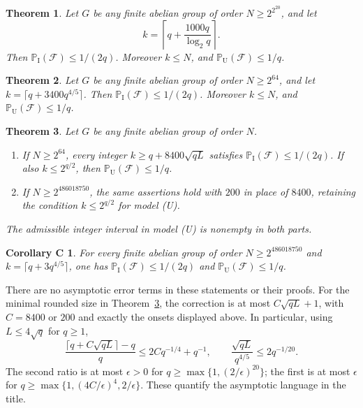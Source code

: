 \documentclass[11pt]{amsart}
\newtheorem{theorem}{Theorem}
\newtheorem*{corC}{Corollary C}
\theoremstyle{remark}
\newcommand{\PI}{\mathbb P_{\mathrm I}}
\newcommand{\PU}{\mathbb P_{\mathrm U}}
\newcommand{\Fail}{\mathcal F}
\begin{document}
\begin{theorem}\label{thm:log}
Let $G$ be any finite abelian group of order $N\ge2^{2^{20}}$, and let
\[
 k=\left\lceil q+\frac{1000q}{\log_2q}\right\rceil.
\]
Then $\PI(\Fail)\le1/(2q)$. Moreover $k\le N$, and
$\PU(\Fail)\le1/q$.
\end{theorem}

\begin{theorem}\label{thm:power}
Let $G$ be any finite abelian group of order $N\ge2^{64}$, and let
$k=\lceil q+3400q^{4/5}\rceil$. Then $\PI(\Fail)\le1/(2q)$.
Moreover $k\le N$, and $\PU(\Fail)\le1/q$.
\end{theorem}

\begin{theorem}\label{thm:sqrt}
Let $G$ be any finite abelian group of order $N$.
\begin{enumerate}
\renewcommand{\labelenumi}{(\alph{enumi})}
\item If $N\ge2^{64}$, every integer $k\ge q+8400\sqrt{qL}$ satisfies
$\PI(\Fail)\le1/(2q)$. If also $k\le2^{q/2}$, then
$\PU(\Fail)\le1/q$.
\item If $N\ge2^{486018750}$, the same assertions hold with $200$ in
place of $8400$, retaining the condition $k\le2^{q/2}$ for model
\textup{(U)}.
\end{enumerate}
The admissible integer interval in model \textup{(U)} is nonempty in
both parts.
\end{theorem}

\begin{corC}\label{cor:power}
For every finite abelian group of order $N\ge2^{486018750}$ and
$k=\lceil q+3q^{4/5}\rceil$, one has $\PI(\Fail)\le1/(2q)$ and
$\PU(\Fail)\le1/q$.
\end{corC}

There are no asymptotic error terms in these statements or their proofs.
For the minimal rounded size in Theorem~\ref{thm:sqrt}, the correction
is at most $C\sqrt{qL}+1$, with $C=8400$ or $200$ and exactly the onsets
displayed above. In particular, using $L\le4\sqrt q$ for $q\ge1$,
\begin{equation}\label{eq:explicit-asymptotic}
 \frac{\lceil q+C\sqrt{qL}\rceil-q}{q}
 \le2Cq^{-1/4}+q^{-1},\qquad
 \frac{\sqrt{qL}}{q^{4/5}}\le2q^{-1/20}.
\end{equation}
The second ratio is at most $\epsilon>0$ for
$q\ge\max\{1,(2/\epsilon)^{20}\}$; the first is at most $\epsilon$
for $q\ge\max\{1,(4C/\epsilon)^4,2/\epsilon\}$.
These quantify the asymptotic language in the title.
\end{document}
